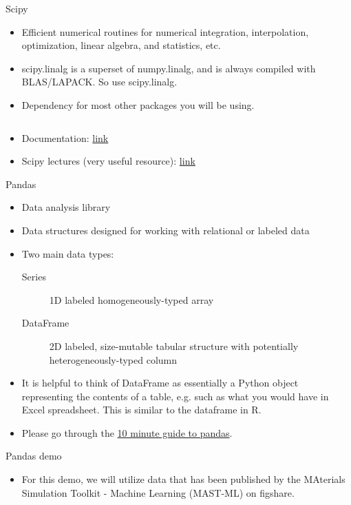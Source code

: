 \documentclass[aspectratio=169]{beamer}
\begin{document}
    \begin{frame}[fragile]{Scipy}
        \begin{itemize}
            \item Efficient numerical routines for numerical integration, interpolation, optimization, linear algebra, and statistics, etc.
            \item scipy.linalg is a superset of numpy.linalg, and is always compiled with BLAS/LAPACK. So use scipy.linalg.
            \item Dependency for most other packages you will be using.
            \inputminted{python}{example_scipy.py}
            \item Documentation: \href{https://docs.scipy.org/doc/scipy/reference/}{link}
            \item Scipy lectures (very useful resource): \href{https://scipy-lectures.org/}{link}
        \end{itemize}
    \end{frame}


    \begin{frame}{Pandas}
        \begin{itemize}
            \item Data analysis library
            \item Data structures designed for working with relational or labeled data
            \item Two main data types:
            \begin{description}
                \item[Series] 1D labeled homogeneously-typed array
                \item[DataFrame] 2D labeled, size-mutable tabular structure with potentially heterogeneously-typed column
            \end{description}
            \item It is helpful to think of DataFrame as essentially a Python object representing the contents of a table, e.g. such as what you would have in Excel spreadsheet. This is similar to the dataframe in R.
            \item Please go through the \href{http://pandas.pydata.org/pandas-docs/stable/getting_started/10min.html}{10 minute guide to pandas}.
        \end{itemize}
    \end{frame}


    \begin{frame}[fragile]{Pandas demo}
        \begin{itemize}
            \item For this demo, we will utilize data that has been published by the MAterials Simulation Toolkit - Machine Learning (MAST-ML) on figshare.
        \end{itemize}
        \inputminted{python}{example_pandas.py}
    \end{frame}
\end{document}
